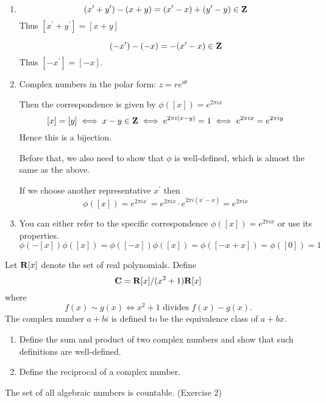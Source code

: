 \begin{solution} \ 
\begin{enumerate}[label=(\alph*)]
\item 
\[ (x^\prime+y^\prime)-(x+y)=(x^\prime-x)+(y^\prime-y)\in \mathbf Z \]
Thus $[x^\prime+y^\prime]=[x+y]$

\[ (-x^\prime)-(-x)=-(x^\prime-x)\in \mathbf Z \]
Thus $[-x^\prime]=[-x]$.

\item Complex numbers in the polar form: $z=re^{i\theta}$

Then the correspondence is given by $\phi([x])=e^{2\pi ix}$
\[ [x]=[y] \iff x-y\in \mathbf Z \iff e^{2\pi i(x-y)}=1 \iff e^{2\pi ix}=e^{2\pi iy} \]
Hence this is a bijection.

Before that, we also need to show that $\phi$ is well-defined, which is almost the same as the above.

If we choose another representative $x^\prime$ then
\[ \phi([x])=e^{2\pi ix^\prime} = e^{2\pi ix}\cdot e^{2\pi i(x^\prime-x)} = e^{2\pi ix} \]

\item You can either refer to the specific correspondence $\phi([x])=e^{2\pi ix}$ or use its properties.
\[ \phi(-[x])\phi([x]) = \phi([-x])\phi([x]) = \phi([-x+x]) = \phi([0]) = 1 \]
\end{enumerate}
\end{solution}
\pagebreak

\begin{prbm}
Let $\mathbf R[x]$ denote the set of real polynomials. Define
\[ \mathbf C=\mathbf R[x]/(x^2+1)\mathbf R[x] \]
where
\[ f(x)\sim g(x) \iff x^2+1 \text{ divides } f(x)-g(x). \]
The complex number $a+bi$ is defined to be the equivalence class of $a+bx$.
\begin{enumerate}[label=(\alph*)]
\item Define the sum and product of two complex numbers and show that such definitions are well-defined.
\item Define the reciprocal of a complex number.
\end{enumerate}
\end{prbm}

\begin{prbm}
The set of all algebraic numbers is countable. (Exercise 2)
\end{prbm}
\pagebreak